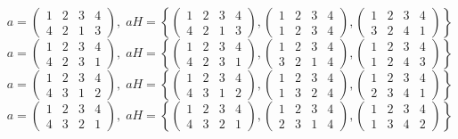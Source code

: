 \documentclass[a4paper,12pt]{article}
\begin{document}
\begin{itemize}
\[a = \begin{pmatrix} 1 & 2 & 3 & 4 \\ 4&2&1&3\end{pmatrix}, \; aH = \left\{\begin{pmatrix} 1 & 2 & 3 & 4 \\ 4&2&1&3\end{pmatrix}, \begin{pmatrix} 1 & 2 & 3 & 4 \\ 1&2&3&4\end{pmatrix}, \begin{pmatrix} 1 & 2 & 3 & 4 \\ 3&2&4&1\end{pmatrix} \right\}\]
\[a = \begin{pmatrix} 1 & 2 & 3 & 4 \\ 4&2&3&1\end{pmatrix}, \; aH = \left\{\begin{pmatrix} 1 & 2 & 3 & 4 \\ 4&2&3&1\end{pmatrix}, \begin{pmatrix} 1 & 2 & 3 & 4 \\ 3&2&1&4\end{pmatrix}, \begin{pmatrix} 1 & 2 & 3 & 4 \\ 1&2&4&3\end{pmatrix} \right\}\]
\[a = \begin{pmatrix} 1 & 2 & 3 & 4 \\ 4&3&1&2\end{pmatrix}, \; aH = \left\{\begin{pmatrix} 1 & 2 & 3 & 4 \\ 4&3&1&2\end{pmatrix}, \begin{pmatrix} 1 & 2 & 3 & 4 \\ 1&3&2&4\end{pmatrix}, \begin{pmatrix} 1 & 2 & 3 & 4 \\ 2&3&4&1\end{pmatrix} \right\}\]
\[a = \begin{pmatrix} 1 & 2 & 3 & 4 \\ 4&3&2&1\end{pmatrix}, \; aH = \left\{\begin{pmatrix} 1 & 2 & 3 & 4 \\ 4&3&2&1\end{pmatrix}, \begin{pmatrix} 1 & 2 & 3 & 4 \\ 2&3&1&4\end{pmatrix}, \begin{pmatrix} 1 & 2 & 3 & 4 \\ 1&3&4&2\end{pmatrix} \right\}\]




\end{itemize}
\end{document}
